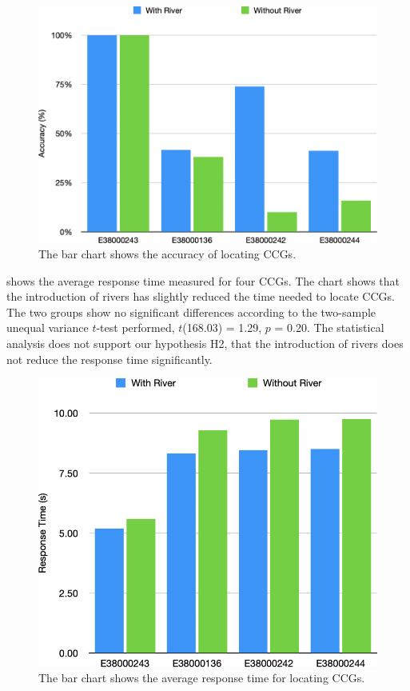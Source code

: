 {
    \begin{figure}[htb!]
        \centering
        \includegraphics[width=\columnwidth,keepaspectratio]{figure/evaluation/accuracy.png}
        \caption{The bar chart shows the accuracy of locating CCGs.}
        \label{fig:task-acc}
    \end{figure}
}


  shows the average response time measured for four CCGs. The chart shows that the introduction of rivers has slightly reduced the time needed to locate CCGs. The two groups show no significant differences according to the two-sample unequal variance $t$-test performed, $t$(168.03) = 1.29, $p$ = 0.20.  The statistical analysis does not support our hypothesis H2, that the introduction of rivers does not reduce the response time significantly.

{
    \begin{figure}[htb!]
        \centering
        \includegraphics[width=\columnwidth,keepaspectratio]{figure/evaluation/rt.png}
        \caption{The bar chart shows the average response time for locating CCGs.}
        \label{fig:task-rt}
    \end{figure}
}
